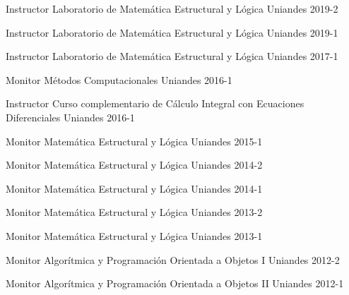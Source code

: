


\begin{cvhonors}

    \cvhonor
    {Instructor}
    {Laboratorio de Matemática Estructural y Lógica}
    {Uniandes}
    {2019-2}

    \cvhonor
    {Instructor}
    {Laboratorio de Matemática Estructural y Lógica}
    {Uniandes}
    {2019-1}

    \cvhonor
    {Instructor}
    {Laboratorio de Matemática Estructural y Lógica}
    {Uniandes}
    {2017-1}

    \cvhonor
    {Monitor}
    {Métodos Computacionales}
    {Uniandes}
    {2016-1}

    \cvhonor
    {Instructor}
    {Curso complementario de Cálculo Integral con Ecuaciones Diferenciales}
    {Uniandes}
    {2016-1}

    \cvhonor
    {Monitor}
    {Matemática Estructural y Lógica}
    {Uniandes}
    {2015-1}

    \cvhonor
    {Monitor}
    {Matemática Estructural y Lógica}
    {Uniandes}
    {2014-2}

    \cvhonor
    {Monitor}
    {Matemática Estructural y Lógica}
    {Uniandes}
    {2014-1}

    \cvhonor
    {Monitor}
    {Matemática Estructural y Lógica}
    {Uniandes}
    {2013-2}

    \cvhonor
    {Monitor}
    {Matemática Estructural y Lógica}
    {Uniandes}
    {2013-1}

    \cvhonor
    {Monitor}
    {Algorítmica y Programación Orientada a Objetos I}
    {Uniandes}
    {2012-2}

    \cvhonor
    {Monitor}
    {Algorítmica y Programación Orientada a Objetos II}
    {Uniandes}
    {2012-1}

\end{cvhonors}
